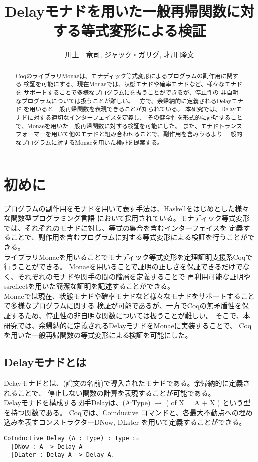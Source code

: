 \documentclass[japanese]{jssst_ppl}
\title{Delayモナドを用いた一般再帰関数に対する等式変形による検証}
\author{川上　竜司, ジャック・ガリグ, 才川 隆文}
\theoremstyle{definition}
\begin{document}
\maketitle
\begin{abstract}
  CoqのライブラリMonaeは、モナディック等式変形によるプログラムの副作用に関する
  検証を可能にする。現在Monaeでは、状態モナドや確率モナドなど、様々なモナドを
  サポートすることで多様なプログラムにを扱うことができるが、停止性の
  非自明なプログラムについては扱うことが難しい。一方で、余帰納的に定義されるDelayモナド
  を用いると一般再帰関数を表現できることが知られている。
  本研究では、Delayモナドに対する適切なインターフェイスを定義し、
  その健全性を形式的に証明することで、Monaeを用いた一般再帰関数に対する検証を可能にした。
  また、モナドトランスフォーマーを用いて他のモナドと組み合わせることで、副作用を含みうるより
  一般的なプログラムに対するMonaeを用いた検証を提案する。
\end{abstract}

\section{初めに}
プログラムの副作用をモナドを用いて表す手法は、Haskellをはじめとした様々な関数型プログラミング言語
において採用されている。モナディック等式変形では、それぞれのモナドに対し、等式の集合を含むインターフェイスを
定義することで、副作用を含むプログラムに対する等式変形による検証を行うことができる。\\
ライブラリMonaeを用いることでモナディック等式変形を定理証明支援系Coqで行うことができる。
Monaeを用いることで証明の正しさを保証できるだけでなく、それぞれのモナドや関手の間の階層を定義することで
再利用可能な証明やssreflectを用いた簡潔な証明を記述することができる。\\
Monaeでは現在、状態モナドや確率モナドなど様々なモナドをサポートすることで多様なプログラムに関する
検証が可能であるが、一方でCoqの無矛盾性を保証するため、停止性の非自明な関数については扱うことが難しい。
そこで、本研究では、余帰納的に定義されるDelayモナドをMonaeに実装することで、
Coqを用いた一般再帰関数の等式変形による検証を可能にした。

\subsection{Delayモナドとは}

Delayモナドとは、(論文の名前)で導入されたモナドである。余帰納的に定義されることで、
停止しない関数の計算を表現することが可能である。\\
Delayモナドを構成する関手Delayは、(A:Type) $\rightarrow$ ( of X = A + X )
という型を持つ関数である。
Coqでは、Coinductive コマンドと、各最大不動点への埋め込みを表すコンストラクターDNow, DLater
を用いて定義することができる。
\begin{verbatim}
CoInductive Delay (A : Type) : Type :=
  |DNow : A -> Delay A
  |DLater : Delay A -> Delay A.
                \end{verbatim}
\end{document}
